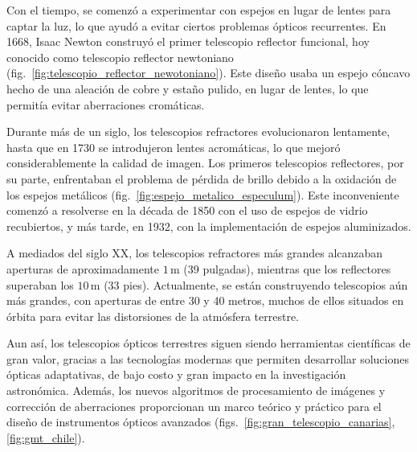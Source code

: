 Con el tiempo, se comenzó a experimentar con espejos en lugar de lentes para captar la luz, lo que ayudó a evitar ciertos problemas ópticos recurrentes. En 1668, Isaac Newton construyó el primer telescopio reflector funcional, hoy conocido como telescopio reflector newtoniano (fig.~\ref{fig:telescopio_reflector_newotoniano}). Este diseño usaba un espejo cóncavo hecho de una aleación de cobre y estaño pulido, en lugar de lentes, lo que permitía evitar aberraciones cromáticas.

Durante más de un siglo, los telescopios refractores evolucionaron lentamente, hasta que en 1730 se introdujeron lentes acromáticas, lo que mejoró considerablemente la calidad de imagen. Los primeros telescopios reflectores, por su parte, enfrentaban el problema de pérdida de brillo debido a la oxidación de los espejos metálicos (fig.~\ref{fig:espejo_metalico_especulum}). Este inconveniente comenzó a resolverse en la década de 1850 con el uso de espejos de vidrio recubiertos, y más tarde, en 1932, con la implementación de espejos aluminizados.


A mediados del siglo XX, los telescopios refractores más grandes alcanzaban aperturas de aproximadamente $1\,\mathrm{m}$ (39 pulgadas), mientras que los reflectores superaban los $10\,\mathrm{m}$ (33 pies). Actualmente, se están construyendo telescopios aún más grandes, con aperturas de entre 30 y 40 metros, muchos de ellos situados en órbita para evitar las distorsiones de la atmósfera terrestre.

Aun así, los telescopios ópticos terrestres siguen siendo herramientas científicas de gran valor, gracias a las tecnologías modernas que permiten desarrollar soluciones ópticas adaptativas, de bajo costo y gran impacto en la investigación astronómica. Además, los nuevos algoritmos de procesamiento de imágenes y corrección de aberraciones proporcionan un marco teórico y práctico para el diseño de instrumentos ópticos avanzados (figs.~\ref{fig:gran_telescopio_canarias}, \ref{fig:gmt_chile}).

